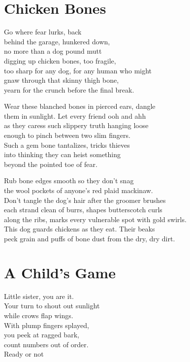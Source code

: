 \documentclass[twoside,10pt]{book}
\begin{document}
\clearpage
\section{Chicken Bones}

Go where fear lurks, back\\
behind the garage, hunkered down,\\
no more than a dog pound mutt\\
digging up chicken bones, too fragile,\\
too sharp for any dog, for any human who might\\
gnaw through that skinny thigh bone,\\
yearn for the crunch before the final break.

Wear these blanched bones in pierced ears, dangle\\
them in sunlight. Let every friend ooh and ahh\\
as they caress such slippery truth hanging loose\\
enough to pinch between two slim fingers.\\
Such a gem bone tantalizes, tricks thieves\\
into thinking they can heist something\\
beyond the pointed toe of fear.

Rub bone edges smooth so they don't snag\\
the wool pockets of anyone's red plaid mackinaw.\\
Don't tangle the dog's hair after the groomer brushes\\
each strand clean of burrs, shapes butterscotch curls\\
along the ribs, marks every vulnerable spot with gold swirls.\\
This dog guards chickens as they eat. Their beaks\\
peck grain and puffs of bone dust from the dry, dry dirt.


\clearpage
\section{A Child's Game}

Little sister, you are it.\\
Your turn to shout out sunlight\\
while crows flap wings.\\
With plump fingers splayed,\\
you peek at ragged bark,\\
count numbers out of order.\\
Ready or not
\end{document}
